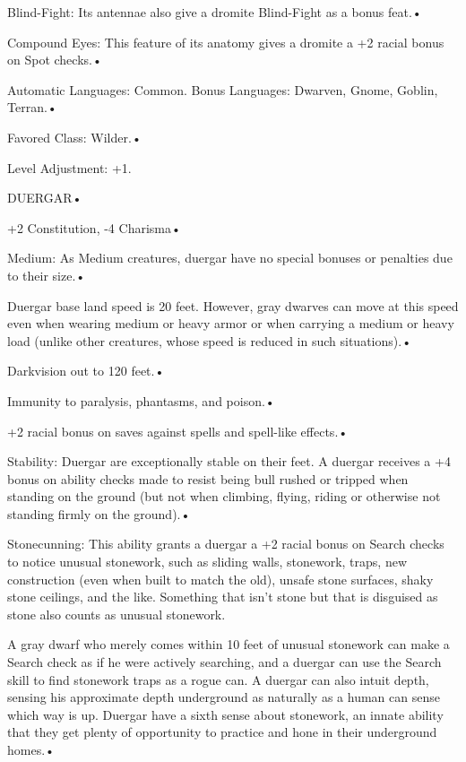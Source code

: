 \documentclass{article}
\begin{document}
Blind-Fight: Its antennae also give a dromite Blind-Fight as a bonus feat.• 

\parindent=7pt
Compound Eyes: This feature of its anatomy gives a dromite a +2 racial bonus on 
Spot checks.• 

\parindent=3pt
Automatic Languages: Common. Bonus Languages: Dwarven, Gnome, Goblin, Terran.• 

Favored Class: Wilder.• 

\parindent=7pt
Level Adjustment: +1.

\vspace{12pt}
\parindent=0pt
{\LARGE{}DUERGAR• }

\parindent=3pt
+2 Constitution, -4 Charisma• 

Medium: As Medium creatures, duergar have no special bonuses or penalties due to 
their size.• 

\parindent=7pt
Duergar base land speed is 20 feet. However, gray dwarves can move at this speed 
even when wearing medium or heavy armor or when carrying a medium or heavy load 
(unlike other creatures, whose speed is reduced in such situations).• 

\parindent=3pt
Darkvision out to 120 feet.• 

Immunity to paralysis, phantasms, and poison.• 

\parindent=7pt
+2 racial bonus on saves against spells and spell-like effects.• 

\parindent=3pt
Stability: Duergar are exceptionally stable on their feet. A duergar receives a 
+4 bonus on ability checks made to resist being bull rushed or tripped when standing 
on the ground (but not when climbing, flying, riding or otherwise not standing 
firmly on the ground).• 

Stonecunning: This ability grants a duergar a +2 racial bonus on Search checks 
to notice unusual stonework, such as sliding walls, stonework, traps, new construction 
(even when built to match the old), unsafe stone surfaces, shaky stone ceilings, 
and the like. Something that isn't stone but that is disguised as stone also counts 
as unusual stonework.

A gray dwarf who merely comes within 10 feet of unusual stonework can make a Search 
check as if he were actively searching, and a duergar can use the Search skill 
to find stonework traps as a rogue can. A duergar can also intuit depth, sensing 
his approximate depth underground as naturally as a human can sense which way is 
up. Duergar have a sixth sense about stonework, an innate ability that they get 
plenty of opportunity to practice and hone in their underground homes.• 
\end{document}

